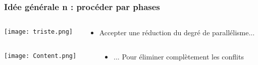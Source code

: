 \documentclass[xcolor={x11names,svgnames},x11names,svgnames]{beamer}
\begin{document}
\begin{frame}
  \frametitle{Idée générale n : procéder par \og phases\fg{}}

  \begin{columns}[c]
    \begin{column}{.1\textwidth}
      \vspace{1mm}
      \texttt{[image: triste.png]}
    \end{column}
    
    \begin{column}{.9\textwidth}
      \begin{itemize}
      \item Accepter une réduction du degré de parallélisme...
      \end{itemize}
    \end{column}
  \end{columns}

  \vspace{1cm}
  
  \begin{columns}[c]
    \begin{column}{.1\textwidth}
      \vspace{3mm}
      \texttt{[image: Content.png]}
    \end{column}
    
    \begin{column}{.9\textwidth}
      \begin{itemize}
      \item ... Pour éliminer complètement les conflits
      \end{itemize}
    \end{column}
  \end{columns}  
\end{frame}

\end{document}
